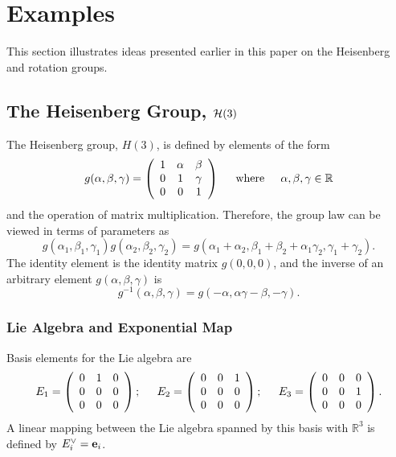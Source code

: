 \documentclass{svmult}
\def\htab{ {\hskip 0.1 true in} }
\newcommand{\ba}{\left(\begin{array}}
\newcommand{\ea}{\end{array}\right)}
\newcommand{\beq}{ \begin{equation}}
\newcommand{\eeq}{ \end{equation} }
\newcommand{\IR}{\mathbb{R}}
\begin{document}

\section{Examples} \label{examplesec}

This section illustrates ideas presented earlier in this paper on the Heisenberg and rotation groups.

%

\subsection{The Heisenberg Group, ${\cal H}(3)$}

The Heisenberg group, $H(3)$, is defined by elements of the form
\beq
g(\alpha, \beta, \gamma) = \ba{ccc}
1 & \alpha & \beta \\
0 & 1 & \gamma \\
0 & 0 & 1
\ea \htab \htab {\rm where} \htab \htab \alpha, \beta, \gamma \in \IR
\label{heissdef}
\eeq
and the operation of matrix multiplication. Therefore, the group law
can be viewed in terms of parameters as
$$ g(\alpha_1, \beta_1, \gamma_1) g(\alpha_2, \beta_2, \gamma_2) =
g(\alpha_1+\alpha_2, \beta_1+\beta_2 + \alpha_1\gamma_2, \gamma_1+\gamma_2). $$
The identity element is the identity matrix $g(0,0,0)$, and the
inverse of an arbitrary element $g(\alpha, \beta, \gamma)$ is
$$ g^{-1}(\alpha, \beta, \gamma) = g(-\alpha, \alpha \gamma - \beta, -\gamma). $$

\subsubsection{Lie Algebra and Exponential Map} 

Basis elements for the Lie algebra are
\beq
E_1 = \ba{ccc}
0 & 1 & 0 \\
0 & 0 & 0 \\
0 & 0 & 0
\ea ; \htab\htab
E_2 = \ba{ccc}
0 & 0 & 1 \\
0 & 0 & 0 \\
0 & 0 & 0
\ea ; \htab\htab
E_3 = \ba{ccc}
0 & 0 & 0 \\
0 & 0 & 1 \\
0 & 0 & 0
\ea .
\eeq
A linear mapping between the Lie algebra spanned by this basis with $\IR^3$ is defined by $E_{i}^{\vee} = {\bf e}_i$.
\end{document}
